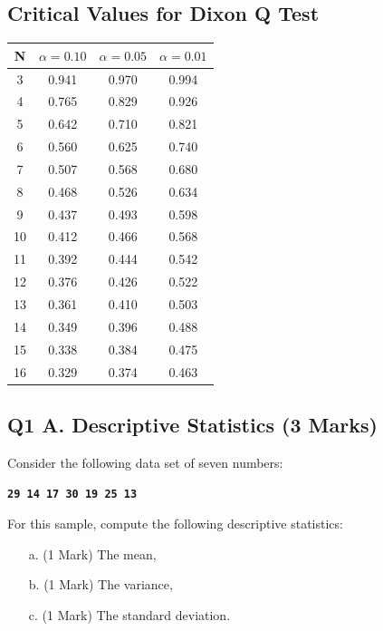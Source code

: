 \documentclass[a4paper,12pt]{article}
\begin{document}
\subsection*{Critical Values for Dixon Q Test}
{
	\Large
	\begin{center}
		\begin{tabular}{|c|c|c|c|}
			\hline  N  & $\alpha=0.10$  & $\alpha=0.05$  & $\alpha=0.01$  \\ \hline
			3  & 0.941 & 0.970 & 0.994 \\ \hline
			4  & 0.765 & 0.829 & 0.926 \\ \hline
			5  & 0.642 & 0.710  & 0.821 \\ \hline
			6  & 0.560 & 0.625 & 0.740 \\ \hline
			7  & 0.507 & 0.568 & 0.680  \\ \hline
			8  & 0.468 & 0.526 & 0.634 \\ \hline
			9  & 0.437 & 0.493 & 0.598 \\ \hline
			10 & 0.412 & 0.466 & 0.568 \\ \hline
			11 & 0.392 & 0.444 & 0.542 \\ \hline
			12 & 0.376 & 0.426 & 0.522 \\ \hline
			13 & 0.361 & 0.410 & 0.503 \\ \hline
			14 & 0.349 & 0.396 & 0.488 \\ \hline
			15 & 0.338 & 0.384 & 0.475 \\ \hline
			16 & 0.329 & 0.374 & 0.463 \\ \hline
		\end{tabular} 
	\end{center}
}

\subsection*{Q1 A. Descriptive Statistics  (3 Marks)} %
Consider the following data set of seven numbers:

\begin{center}
	\textbf{\texttt{29 14 17 30 19 25 13}}
\end{center}

\noindent For this sample, compute the following descriptive statistics:
\begin{itemize}
	\item[a.] (1 Mark) The mean,
	\item[b.] (1 Mark) The variance,
	\item[c.] (1 Mark) The standard deviation.
\end{itemize}
\newpage
\end{document}
